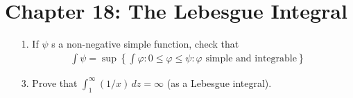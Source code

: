 \documentclass{article}
\begin{document}
\section*{Chapter 18: The Lebesgue Integral}

\begin{itemize}
	\item[1.] If $\psi$ s a non-negative simple function, check that
		\begin{align*}
			\int \psi = \sup\left\{ \int\varphi:0\le \varphi\le \psi: \varphi\text{ simple and integrable} \right\}
		\end{align*}

	\item[3.] Prove that $\int_1^\infty (1/x)\, dz=\infty$ (as a Lebesgue integral).
		
\end{itemize}
\end{document}
